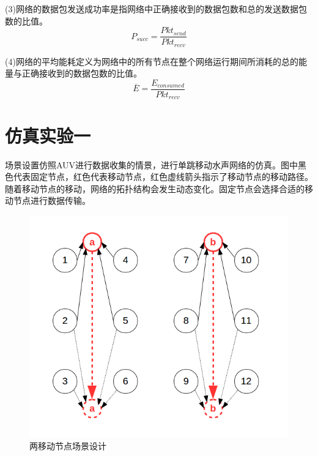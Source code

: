 (3)网络的数据包发送成功率是指网络中正确接收到的数据包数和总的发送数据包数的比值。
\begin{equation}
P_{succ}=\frac{Pkt_{send}}{Pkt_{recv}}
\end{equation}

(4)网络的平均能耗定义为网络中的所有节点在整个网络运行期间所消耗的总的能量与正确接收到的数据包数的比值。
\begin{equation}
\overline E=\frac{E_{consumed}}{Pkt_{recv}}
\end{equation}

\section {仿真实验一}
场景设置仿照AUV进行数据收集的情景，进行单跳移动水声网络的仿真。图中黑色代表固定节点，红色代表移动节点，红色虚线箭头指示了移动节点的移动路径。随着移动节点的移动，网络的拓扑结构会发生动态变化。固定节点会选择合适的移动节点进行数据传输。

 \begin{figure}[!ht]
 	\centering
 	\includegraphics[scale=0.5]{figures/2scen.png}
 	\caption{
 		两移动节点场景设计
 	}
 	\label{fig:example}
 \end{figure}

